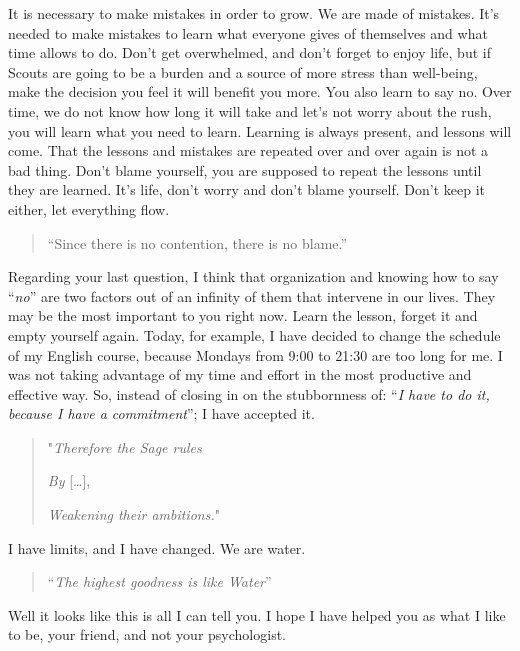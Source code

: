 \documentclass[]{book}
\begin{document}
It is necessary to make mistakes in order to grow. We are made of mistakes. It's needed to make mistakes to learn what everyone gives of themselves and what time allows to do. Don't get overwhelmed, and don't forget to enjoy life, but if Scouts are going to be a burden and a source of more stress than well-being, make the decision you feel it will benefit you more. You also learn to say no. Over time, we do not know how long it will take and let's not worry about the rush, you will learn what you need to learn. Learning is always present, and lessons will come. That the lessons and mistakes are repeated over and over again is not a bad thing. Don't blame yourself, you are supposed to repeat the lessons until they are learned. It's life, don't worry and don't blame yourself. Don't keep it either, let everything flow.

\begin{quote}
``Since there is no contention, there is no blame.''

\citep{ta1984tao}
\end{quote}

Regarding your last question, I think that organization and knowing how to say ``\emph{no}'' are two factors out of an infinity of them that intervene in our lives. They may be the most important to you right now. Learn the lesson, forget it and empty yourself again. Today, for example, I have decided to change the schedule of my English course, because Mondays from 9:00 to 21:30 are too long for me. I was not taking advantage of my time and effort in the most productive and effective way. So, instead of closing in on the stubbornness of: ``\emph{I have to do it, because I have a commitment}''; I have accepted it.

\begin{quote}
"\emph{Therefore the Sage rules}

\emph{By} {[}\ldots{]},

\emph{Weakening their ambitions.}"

\citep{ta1984tao}
\end{quote}

I have limits, and I have changed. We are water.

\begin{quote}
``\emph{The highest goodness is like Water}''

\citep{ta1984tao}
\end{quote}

Well it looks like this is all I can tell you. I hope I have helped you as what I like to be, your friend, and not your psychologist.
\end{document}
